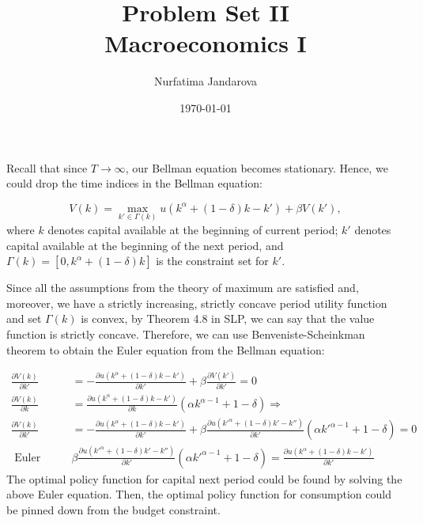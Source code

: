 \documentclass[]{article}
\title{Problem Set II \\ \large Macroeconomics I}
\author{Nurfatima Jandarova}
\date{\today}
\begin{document}
\maketitle

\section{}
\subsection{}\label{1.1}
Recall that since $T\rightarrow\infty$, our Bellman equation becomes stationary. Hence, we could drop the time indices in the Bellman equation:

\begin{equation}
	V(k) = \max\limits_{k'\in\Gamma(k)}u(k^\alpha + (1 - \delta)k - k') + \beta V(k'), \nonumber
\end{equation}
where $k$ denotes capital available at the beginning of current period; $k'$ denotes capital available at the beginning of the next period, and $\Gamma(k) = [0, k^\alpha + (1 - \delta)k]$ is the constraint set for $k'$.

Since all the assumptions from the theory of maximum are satisfied and, moreover, we have a strictly increasing, strictly concave period utility function and set $\Gamma(k)$ is convex, by Theorem 4.8 in SLP, we can say that the value function is strictly concave. Therefore, we can use Benveniste-Scheinkman theorem to obtain the Euler equation from the Bellman equation:

\begin{equation}
	\begin{split}
	\frac{\partial V(k)}{\partial k'}& = -\frac{\partial u(k^\alpha + (1 - \delta)k - k')}{\partial k'} + \beta\frac{\partial V(k')}{\partial k'} = 0 \\ \nonumber
	\frac{\partial V(k)}{\partial k}& = \frac{\partial u(k^\alpha + (1 - \delta)k - k')}{\partial k}(\alpha k^{\alpha-1} + 1 - \delta) \Longrightarrow \\
	\frac{\partial V(k)}{\partial k'}& = -\frac{\partial u(k^\alpha + (1 - \delta)k - k')}{\partial k'} + \beta\frac{\partial u({k'}^\alpha + (1 - \delta)k' - k'')}{\partial k'}(\alpha {k'}^{\alpha-1} + 1 - \delta) = 0 \\
	\text{ Euler equation: }& \beta\frac{\partial u({k'}^\alpha + (1 - \delta)k' - k'')}{\partial k'}(\alpha {k'}^{\alpha-1} + 1 - \delta) = \frac{\partial u(k^\alpha + (1 - \delta)k - k')}{\partial k'}
	\end{split}
\end{equation}
The optimal policy function for capital next period could be found by solving the above Euler equation. Then, the optimal policy function for consumption could be pinned down from the budget constraint.
\end{document}
